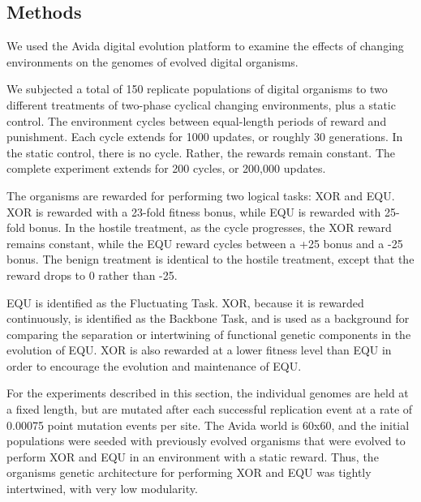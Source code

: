 \subsection{Methods}

We used the Avida digital evolution platform to examine the effects of changing environments on the genomes of evolved digital organisms.

We subjected a total of 150 replicate populations of digital organisms to two different treatments of two-phase cyclical changing environments, plus a static control. The environment cycles between equal-length periods of reward and punishment. Each cycle extends for 1000 updates, or roughly 30 generations. In the static control, there is no cycle. Rather, the rewards remain constant. The complete experiment extends for 200 cycles, or 200,000 updates.

The organisms are rewarded for performing two logical tasks: XOR and EQU. XOR is rewarded with a 23-fold fitness bonus, while EQU is rewarded with 25-fold bonus. In the hostile treatment, as the cycle progresses, the XOR reward remains constant, while the EQU reward cycles between a +25 bonus and a -25 bonus. The benign treatment is identical to the hostile treatment, except that the reward drops to 0 rather than -25.

EQU is identified as the Fluctuating Task. XOR, because it is rewarded continuously, is identified as the Backbone Task, and is used as a background for comparing the separation or intertwining of functional genetic components in the evolution of EQU. XOR is also rewarded at a lower fitness level than EQU in order to encourage the evolution and maintenance of EQU.

For the experiments described in this section, the individual genomes are held at a fixed length, but are mutated after each successful replication event at a rate of 0.00075 point mutation events per site. The Avida world is 60x60, and the initial populations were seeded with previously evolved organisms that were evolved to perform XOR and EQU in an environment with a static reward. Thus, the organisms genetic architecture for performing XOR and EQU was tightly intertwined, with very low modularity.
